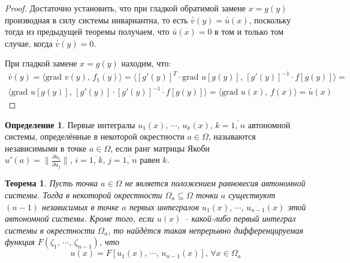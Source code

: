 \documentclass[a4paper,12pt]{article}
\theoremstyle{plain}
\newtheorem{theorem}{Теорема}[section]
\theoremstyle{definition}
\newtheorem{definition}{Определение}[section]
\theoremstyle{remark}
\begin{document}
\begin{proof}
	Достаточно установить, что при гладкой обратимой замене $x = g(y)$ производная в силу системы инвариантна, то есть $\overset{'}{v}(y) = \overset{'}{u}(x)$, поскольку тогда из предыдущей теоремы получаем, что $\overset{'}{u}(x) = 0$ в том и только том случае, когда $\overset{'}{v}(y) = 0$.

	При гладкой замене $x = g(y)$ находим, что:
	\begin{align*}
		\overset{'}{v}(y) = \langle \text{grad }v(y),\, f_1(y)\rangle = \langle [g'(y)]^T \cdot \text{grad }u[g(y)],\, [g'(y)]^{-1}\cdot f[g(y)]\rangle = \\
		\langle \text{grad }u[g(y)],\, [g'(y)] \cdot [g'(y)]^{-1}\cdot f[g(y)] \rangle = \langle \text{grad }u(x),\, f(x)\rangle = \overset{'}{u}(x)
	\end{align*}
\end{proof}

\begin{definition}
	Первые интегралы $u_1(x),\,\cdots,\,u_k(x),\, k = \overline{1,\,n}$ автономной системы, определённые в некоторой окрестности $a \in \Omega$, называются независимыми в точке $a \in \Omega$, если ранг матрицы Якоби $u'(a) = \|\frac{\partial u_i}{\partial u_j}\|,\, i = \overline{1,\,k},\, j = \overline{1,\,n}$ равен $k$.
\end{definition}

\begin{theorem}
	Пусть точка $a \in \Omega$ не является положением равновесия автономной системы. Тогда в некоторой окрестности $\Omega_a \subseteq \Omega$ точки $a$ существуют $(n - 1)$ независимых в точке $a$ первых интегралов $u_1(x),\,\cdots,\,u_{n - 1}(x)$ этой автономной системы. Кроме того, если $u(x)$ -- какой-либо первый интеграл системы в окрестности $\Omega_a$, то найдётся такая непрерывно дифференцируемая функция $F(\zeta_1,\,\cdots,\,\zeta_{n-1})$, что
	\[u(x) = F[u_1(x),\,\cdots,\,u_{n-1}(x)],\, \forall x \in \Omega_a\]
\end{theorem}
\end{document}
